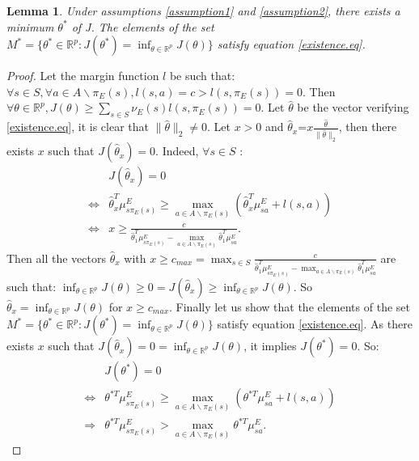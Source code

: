 \documentclass[tablecaption=bottom]{jmlr}
\newtheorem{lemme}{Lemma}
\begin{document}
\begin{lemme}
\label{proposition1} Under assumptions \ref{assumption1} and
\ref{assumption2}, there exists a minimum $\theta^*$ of J. The
elements of the set $M^*=\{\theta^*\in\mathbb{R}^p:
J(\theta^*)=\inf_{\theta\in\mathbb{R}^p}J(\theta)\}$ satisfy
equation \eqref{existence.eq}.
\end{lemme}
\begin{proof}
Let the margin function $l$ be such that: $\forall s\in S, \forall
a\in A\backslash\pi_E(s), l(s,a)=c>l(s,\pi_E(s))=0$. Then $\forall
\theta\in\mathbb{R}^p,J(\theta)\geq\sum_{s\in
S}\nu_E(s)l(s,\pi_E(s))=0$. Let $\hat{\theta}$ be the vector
verifying \eqref{existence.eq}, it is clear that
$\|\hat{\theta}\|_2\neq0$. Let $x>0$ and
$\hat{\theta}_x$=$x\frac{\hat{\theta}}{\|\hat{\theta}\|_2}$, then
there exists $x$ such that $J(\hat{\theta}_x)=0$. Indeed, $\forall
s\in S$ :
\begin{align}
&J(\hat{\theta}_x)=0\\
\Leftrightarrow&\hat{\theta}_x^T\mu^E_{s\pi_E(s)}\geq\max_{a \in A\backslash\pi_E(s)}(\hat{\theta}_x^T\mu^E_{sa}+l(s,a))\\
\Leftrightarrow&x\geq\frac{c}{\hat{\theta}_1^T\mu^E_{s\pi_E(s)}-\max_{a \in A\backslash\pi_E(s)}\hat{\theta}_1^T\mu^E_{sa}}.
\end{align}
Then all the vectors $\hat{\theta}_x$ with $x\geq c_{max}=\max_{s\in
S}\frac{c}{\hat{\theta}_1^T\mu^E_{s\pi_E(s)}-\max_{a \in
A\backslash\pi_E(s)}\hat{\theta}_1^T\mu^E_{sa}}$ are such that:
$\inf_{\theta\in\mathbb{R}^p}J(\theta)\geq0=J(\hat{\theta}_x)\geq\inf_{\theta\in\mathbb{R}^p}J(\theta)$.
So $\hat{\theta}_x=\inf_{\theta\in\mathbb{R}^p}J(\theta)$ for $x\geq
c_{max}$. Finally let us show that the elements of the set
$M^*=\{\theta^*\in\mathbb{R}^p:
J(\theta^*)=\inf_{\theta\in\mathbb{R}^p}J(\theta)\}$ satisfy
equation \eqref{existence.eq}. As there exists $x$ such that
$J(\hat{\theta}_x)=0=\inf_{\theta\in\mathbb{R}^p}J(\theta)$, it
implies $J(\theta^*)=0$. So:
\begin{align}
&J(\theta^*)=0\\
\Leftrightarrow&\theta^{*T}\mu^E_{s\pi_E(s)}\geq\max_{a \in A\backslash\pi_E(s)}(\theta^{*T}\mu^E_{sa}+l(s,a))\\
\Rightarrow&\theta^{*T}\mu^E_{s\pi_E(s)}>\max_{a \in A\backslash\pi_E(s)}\theta^{*T}\mu^E_{sa}.
\end{align}
\end{proof}
\end{document}
